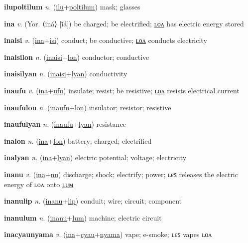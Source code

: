\textbf{\hypertarget{ilupoltilum}{ilupoltilum}} \textit{n.} (\hyperlink{ilu}{ilu}+\allowbreak \hyperlink{poltilum}{poltilum})
mask; glasses

\textbf{\hypertarget{ina}{ina}} \textit{v.} (Yor. ⟨iná⟩ [ĩ̄á])
be charged; be electrified; \hyperlink{inalon}{ʟᴏᴧ} has electric energy stored

\textbf{\hypertarget{inaisi}{inaisi}} \textit{v.} (\hyperlink{ina}{ina}+\allowbreak \hyperlink{isi}{isi})
conduct; be conductive; \hyperlink{inaisilon}{ʟᴏᴧ} conducts electricity

\textbf{\hypertarget{inaisilon}{inaisilon}} \textit{n.} (\hyperlink{inaisi}{inaisi}+\allowbreak \hyperlink{lon}{lon})
conductor; conductive

\textbf{\hypertarget{inaisilyan}{inaisilyan}} \textit{n.} (\hyperlink{inaisi}{inaisi}+\allowbreak \hyperlink{lyan}{lyan})
conductivity

\textbf{\hypertarget{inaufu}{inaufu}} \textit{v.} (\hyperlink{ina}{ina}+\allowbreak \hyperlink{ufu}{ufu})
insulate; resist; be resistive; \hyperlink{inaufulon}{ʟᴏᴧ} resists electrical current

\textbf{\hypertarget{inaufulon}{inaufulon}} \textit{n.} (\hyperlink{inaufu}{inaufu}+\allowbreak \hyperlink{lon}{lon})
insulator; resistor; resistive

\textbf{\hypertarget{inaufulyan}{inaufulyan}} \textit{n.} (\hyperlink{inaufu}{inaufu}+\allowbreak \hyperlink{lyan}{lyan})
resistance

\textbf{\hypertarget{inalon}{inalon}} \textit{n.} (\hyperlink{ina}{ina}+\allowbreak \hyperlink{lon}{lon})
battery; charged; electrified

\textbf{\hypertarget{inalyan}{inalyan}} \textit{n.} (\hyperlink{ina}{ina}+\allowbreak \hyperlink{lyan}{lyan})
electric potential; voltage; electricity

\textbf{\hypertarget{inanu}{inanu}} \textit{v.} (\hyperlink{ina}{ina}+\allowbreak \hyperlink{nu}{nu})
discharge; shock; electrify; power; ʟєꜱ releases the electric energy of ʟᴏᴧ onto \hyperlink{inanulum}{ʟᴜᴍ}

\textbf{\hypertarget{inanulip}{inanulip}} \textit{n.} (\hyperlink{inanu}{inanu}+\allowbreak \hyperlink{lip}{lip})
conduit; wire; circuit; component

\textbf{\hypertarget{inanulum}{inanulum}} \textit{n.} (\hyperlink{inanu}{inanu}+\allowbreak \hyperlink{lum}{lum})
machine; electric circuit

\textbf{\hypertarget{inacyaunyama}{inacyaunyama}} \textit{v.} (\hyperlink{ina}{ina}+\allowbreak \hyperlink{cyau}{cyau}+\allowbreak \hyperlink{nyama}{nyama})
vape; e-smoke; ʟєꜱ vapes ʟᴏᴧ

